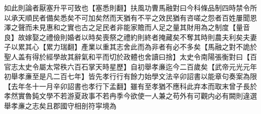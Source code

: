 如此則論者厭塞升平可致也【塞悉則翻】扶風功曹馬融對曰今科條品制四時禁令所以承天順民者備矣悉矣不可加矣然而天猶有不平之效民猶有咨嗟之怨者百姓屢聞恩澤之聲而未見惠和之實也古之足民者非能家贍而人足之量其財用為之制度【量音良】故嫁娶之禮儉則婚者以時矣喪祭之禮約則終者掩藏矣不奪其時則農夫利矣夫妻子以累其心【累力瑞翻】產業以重其志舍此而為非者有必不多矣【馬融之對不詭於聖人盖有得於經學故其辭氣和平而切於政體也舍讀曰捨】太史令南陽張衡對曰【百官志太史令屬太常秩六百石掌天時星歷】自初舉孝亷迄今二百歲矣【武帝元光元年初舉孝亷至是凡二百七年】皆先孝行行有餘力始學文法辛卯詔書以能章句奏案為限【去年冬十一月辛卯詔書也孝行下孟翻】雖有至孝猶不應科此弃本而取末曾子長於孝然實魯鈍文學不若游夏政事不若冉季今欲使一人兼之苟外有可觀内必有闕則違選舉孝亷之志矣且郡國守相剖符寜境為